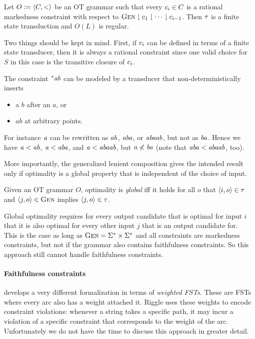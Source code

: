 %
\begin{theorem}
    Let $O \mathrel{\mathop:}= \left \langle C,< \right \rangle $ be an OT grammar such that every $c_i \in C$ is a rational markedness constraint with respect to $\textsc{Gen} \downharpoonright c_1 \downharpoonright \cdots \downharpoonright c_{i-1}$.
    Then $\tau$ is a finite state transduction and $O(L)$ is regular.
\end{theorem}
%
Two things should be kept in mind.
First, if $c_i$ can be defined in terms of a finite state transducer, then it is always a rational constraint since one valid choice for $S$ in this case is the transitive closure of $c_i$.
%
\begin{examplebox}
    The constraint $^*\mathit{ab}$ can be modeled by a transducer that non-deterministically inserts
    \begin{itemize}
        \item a $b$ after an $a$, or
        \item $ab$ at arbitrary points.
    \end{itemize}
    For instance $\mathit{a}$ can be rewritten as $\mathit{ab}$, $\mathit{aba}$, or $\mathit{abaab}$, but not as $\mathit{ba}$.
    Hence we have $\mathit{a} < \mathit{ab}$, $\mathit{a} < \mathit{aba}$, and $\mathit{a} < \mathit{abaab}$, but $\mathit{a} \not< \mathit{ba}$ (note that $\mathit{aba} < \mathit{abaab}$, too).
\end{examplebox}
%
More importantly, the generalized lenient composition gives the intended result only if optimality is a global property that is independent of the choice of input.
%
\begin{definition}
    Given an OT grammar $O$, optimality is \emph{global} iff it holds for all $o$ that $\left \langle i,o \right \rangle  \in \tau$ and $\left \langle j,o \right \rangle  \in \textsc{Gen}$ implies $\left \langle j,o \right \rangle  \in \tau$.
\end{definition}
%
Global optimality requires for every output candidate that is optimal for input $i$ that it is also optimal for every other input $j$ that is an output candidate for.
This is the case as long as $\textsc{Gen} = \Sigma^* \times \Sigma^*$ and all constraints are markedness constraints, but not if the grammar also contains faithfulness constraints.
So this approach still cannot handle faithfulness constraints.

\paragraph{Faithfulness constraints}
\citet{Riggle04} develops a very different formalization in terms of \emph{weighted FSTs}.
These are FSTs where every arc also has a weight attached it.
Riggle uses these weights to encode constraint violations: whenever a string takes a specific path, it may incur a violation of a specific constraint that corresponds to the weight of the arc.
Unfortunately we do not have the time to discuss this approach in greater detail.

